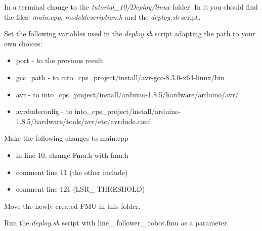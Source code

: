 \documentclass[11pt,a4paper]{../tutorial}
\begin{document}
\begin{instructions}
\item In a terminal change to the \emph{tutorial\_10/Deploy/linux} folder. In it you should find the files: \emph{main.cpp}, \emph{modeldescription.h} and the \emph{deploy.sh} script.

\item Set the following variables used in the \emph{deploy.sh} script adapting the path to your own choices:
	\begin{itemize}
		\item port - to the previous result
		\item gcc\_path - to into\_cps\_project/install/avr-gcc-8.3.0-x64-linux/bin
		\item avr - to into\_cps\_project/install/arduino-1.8.5/hardware/arduino/avr/
		\item avrdudeconfig - to into\_cps\_project/install/arduino-1.8.5/hardware/tools/avr/etc/avrdude.conf
	\end{itemize}
\item Make the following changes to main.cpp
	\begin{itemize}
		\item in line 10, change Fmu.h with fmu.h
		\item comment line 11 (the other include)
		\item comment line 121 (LSR\_ THRESHOLD)
	\end{itemize}
\item Move the newly created FMU in this folder.
\item Run the \emph{deploy.sh} script with  line\_ follower\_ robot.fmu as a parameter.
\end{instructions}
\end{document}
